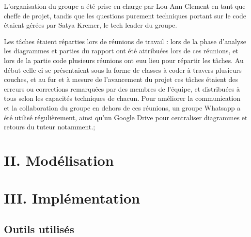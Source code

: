 \documentclass[
  french,
  11pt,
  letterpaper,
  DIV=11,
  numbers=noendperiod]{scrartcl}
\begin{document}
L'organisation du groupe a été prise en charge par Lou-Ann Clement en
tant que cheffe de projet, tandis que les questions purement techniques
portant sur le code étaient gérées par Satya Kremer, le tech leader du
groupe.

Les tâches étaient réparties lors de réunions de travail : lors de la
phase d'analyse les diagrammes et parties du rapport ont été attribuées
lors de ces réunions, et lors de la partie code plusieurs réunions ont
euu lieu pour répartir les tâches. Au début celle-ci se présentaient
sous la forme de classes à coder à travers plusieurs couches, et au fur
et à mesure de l'avancement du projet ces tâches étaient des erreurs ou
corrections remarquées par des membres de l'équipe, et distribuées à
tous selon les capacités techniques de chacun. Pour améliorer la
communication et la collaboration du groupe en dehors de ces réunions,
un groupe Whatsapp a été utilisé régulièrement, ainsi qu'un Google Drive
pour centraliser diagrammes et retours du tuteur notamment.;

\section{II. Modélisation}\label{ii.-moduxe9lisation}

\section{III. Implémentation}\label{iii.-impluxe9mentation}

\subsection{Outils utilisés}\label{outils-utilisuxe9s}
\end{document}
